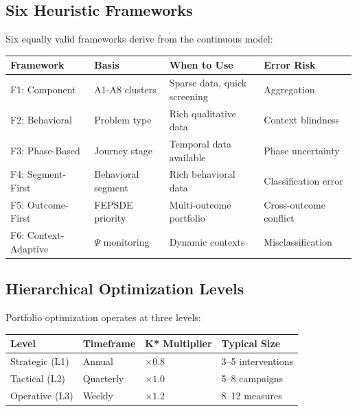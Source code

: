 \subsection{Six Heuristic Frameworks}

Six equally valid frameworks derive from the continuous model:

\begin{center}
\renewcommand{\arraystretch}{1.2}
\small
\begin{tabular}{@{}llll@{}}
\toprule
\textbf{Framework} & \textbf{Basis} & \textbf{When to Use} & \textbf{Error Risk} \\
\midrule
F1: Component & A1-A8 clusters & Sparse data, quick screening & Aggregation \\
F2: Behavioral & Problem type & Rich qualitative data & Context blindness \\
F3: Phase-Based & Journey stage & Temporal data available & Phase uncertainty \\
F4: Segment-First & Behavioral segment & Rich behavioral data & Classification error \\
F5: Outcome-First & FEPSDE priority & Multi-outcome portfolio & Cross-outcome conflict \\
F6: Context-Adaptive & $\Psi$ monitoring & Dynamic contexts & Misclassification \\
\bottomrule
\end{tabular}
\end{center}

\subsection{Hierarchical Optimization Levels}

Portfolio optimization operates at three levels:

\begin{center}
\renewcommand{\arraystretch}{1.2}
\begin{tabular}{@{}llll@{}}
\toprule
\textbf{Level} & \textbf{Timeframe} & \textbf{K* Multiplier} & \textbf{Typical Size} \\
\midrule
Strategic (L1) & Annual & $\times 0.8$ & 3--5 interventions \\
Tactical (L2) & Quarterly & $\times 1.0$ & 5--8 campaigns \\
Operative (L3) & Weekly & $\times 1.2$ & 8--12 measures \\
\bottomrule
\end{tabular}
\end{center}

